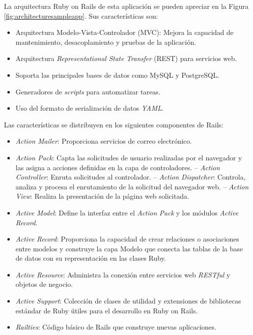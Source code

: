 La arquitectura Ruby on Rails de esta aplicación se pueden apreciar en la Figura \ref{fig:architecturesampleapp}. Sus características son:
\begin{itemize}
\item Arquitectura Modelo-Vista-Controlador (MVC): Mejora la capacidad de mantenimiento, desacoplamiento y pruebas de la aplicación.
\item Arquitectura \textit{Representational State Transfer} (REST) para servicios web.
\item Soporta las principales bases de datos como MySQL y PostgreSQL.
\item Generadores de \textit{scripts} para automatizar tareas.
\item Uso del formato de serialización de datos \textit{YAML}.
\end{itemize}

Las características se distribuyen en los siguientes componentes de Rails:
\begin{itemize}
\item \textit{Action Mailer}: Proporciona servicios de correo electrónico. 
\item \textit{Action Pack}: Capta las solicitudes de usuario realizadas por el navegador y las asigna a acciones definidas en la capa de controladores.
\subitem-- \textit{Action Controller}: Enruta solicitudes al controlador. 
\subitem-- \textit{Action Dispatcher}: Controla, analiza y procesa el enrutamiento de la solicitud del navegador web.
\subitem-- \textit{Action View}: Realiza la presentación de la página web solicitada.
\item \textit{Active Model}: Define la interfaz entre el \textit{Action Pack} y los módulos \textit{Active Record}.
\item \textit{Active Record}: Proporciona la capacidad de crear relaciones o asociaciones entre modelos y construye la capa Modelo que conecta las tablas de la base de datos con su representación en las clases Ruby.
\item \textit{Active Resource}: Administra la conexión entre servicios web \textit{RESTful} y objetos de negocio.
\item \textit{Active Support}: Colección de clases de utilidad y extensiones de bibliotecas estándar de Ruby útiles para el desarrollo en Ruby on Rails.
\item \textit{Railties}: Código básico de Rails que construye nuevas aplicaciones. 
\end{itemize}	

